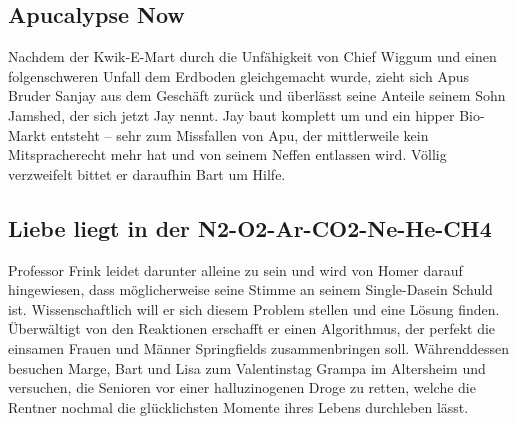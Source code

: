 
\subsection{Apucalypse Now}\label{VABF05}
Nachdem der Kwik-E-Mart durch die Unfähigkeit von Chief Wiggum und einen folgenschweren Unfall dem Erdboden gleichgemacht wurde, zieht sich Apus Bruder Sanjay aus dem Geschäft zurück und überlässt seine Anteile seinem Sohn Jamshed, der sich jetzt Jay nennt. Jay baut komplett um und ein hipper Bio-Markt entsteht -- sehr zum Missfallen von Apu, der mittlerweile kein Mitspracherecht mehr hat und von seinem Neffen entlassen wird. Völlig verzweifelt bittet er daraufhin Bart um Hilfe.


\subsection{Liebe liegt in der N2-O2-Ar-CO2-Ne-He-CH4}\label{VABF07}
Professor Frink leidet darunter alleine zu sein und wird von Homer darauf hingewiesen, dass möglicherweise seine Stimme an seinem Single-Dasein Schuld ist. Wissenschaftlich will er sich diesem Problem stellen und eine Lösung finden. Überwältigt von den Reaktionen erschafft er einen Algorithmus, der perfekt die einsamen Frauen und Männer Springfields zusammenbringen soll. Währenddessen besuchen Marge, Bart und Lisa zum Valentinstag Grampa im Altersheim und versuchen, die Senioren vor einer halluzinogenen Droge zu retten, welche die Rentner nochmal die glücklichsten Momente ihres Lebens durchleben lässt.

